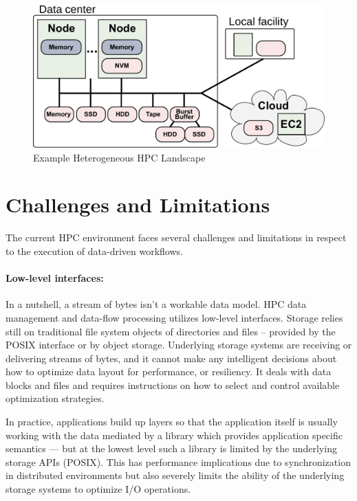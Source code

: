 \documentclass[a4paper, twocolumn]{article}
\begin{document}
\begin{figure}[b]
  \centering
  \includegraphics[width=\columnwidth]{system}
  \caption{Example Heterogeneous HPC Landscape}
  \label{fig:heterogeneous}
\end{figure}

\section{Challenges and Limitations}
\label{sec:challenges}
The current HPC environment faces several challenges and limitations in respect to the execution of data-driven workflows.



\paragraph{Low-level interfaces:}
In a nutshell, a stream of bytes isn't a workable data model.
HPC data management and data-flow processing utilizes low-level interfaces.
Storage relies still on traditional file system objects of directories and files -- provided by the POSIX interface or by object storage.
Underlying storage systems are receiving or delivering streams of bytes, and it cannot make any intelligent decisions about how to optimize data layout for performance, or resiliency.
It deals with data blocks and files and requires instructions on how to select and control available optimization strategies.

In practice, applications build up layers so that the application itself is usually working with the data mediated by a library which provides application specific semantics --- but at the lowest level such a library is limited by the underlying storage APIs (POSIX).
This has performance implications due to synchronization in distributed environments but also severely limits the ability of the underlying storage systems to optimize I/O operations.
\end{document}
